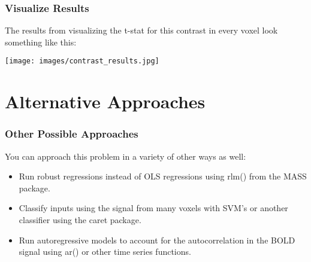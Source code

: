 \documentclass{beamer}
\begin{document}
\frame
{
	\frametitle{Visualize Results}

	The results from visualizing the t-stat for this contrast in every voxel look something like this:
	
	\begin{center}
		\texttt{[image: images/contrast\_results.jpg]}
	\end{center}
}

\section{Alternative Approaches}

\frame
{
	\frametitle{Other Possible Approaches}
  
	You can approach this problem in a variety of other ways as well:
	
	\begin{itemize}
		\item{Run robust regressions instead of OLS regressions using rlm() from the MASS package.}
		\item{Classify inputs using the signal from many voxels with SVM's or another classifier using the caret package.}
		\item{Run autoregressive models to account for the autocorrelation in the BOLD signal using ar() or other time series functions.}
	\end{itemize}
}
\end{document}
